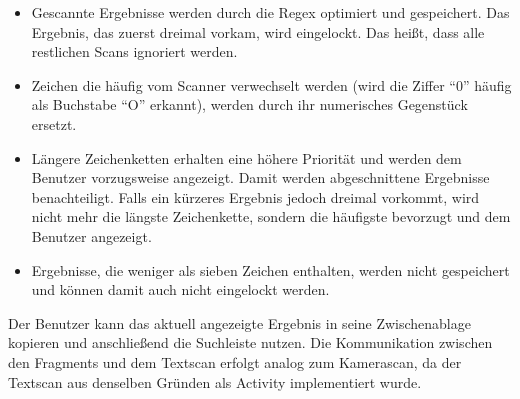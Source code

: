 \begin{itemize}
\tightlist
\item
  Gescannte Ergebnisse werden durch die Regex optimiert und gespeichert.
  Das Ergebnis, das zuerst dreimal vorkam, wird eingelockt. Das heißt,
  dass alle restlichen Scans ignoriert werden.
\item
  Zeichen die häufig vom Scanner verwechselt werden (\zB wird die Ziffer
  ``0'' häufig als Buchstabe ``O'' erkannt), werden durch ihr
  numerisches Gegenstück ersetzt.
\item
  Längere Zeichenketten erhalten eine höhere Priorität und werden dem
  Benutzer vorzugsweise angezeigt. Damit werden abgeschnittene
  Ergebnisse benachteiligt. Falls ein kürzeres Ergebnis jedoch dreimal
  vorkommt, wird nicht mehr die längste Zeichenkette, sondern die
  häufigste bevorzugt und dem Benutzer angezeigt.
\item
  Ergebnisse, die weniger als sieben Zeichen enthalten, werden nicht
  gespeichert und können damit auch nicht eingelockt werden.
\end{itemize}

Der Benutzer kann das aktuell angezeigte Ergebnis in seine
Zwischenablage kopieren und anschließend die Suchleiste nutzen. Die
Kommunikation zwischen den Fragments und dem Textscan erfolgt analog zum
Kamerascan, da der Textscan aus denselben Gründen als Activity
implementiert wurde.

